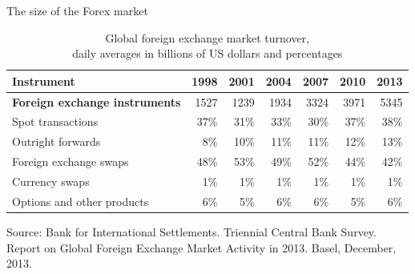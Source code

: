 \documentclass[international_finance_p1.tex]{subfiles}
\begin{document}
\begin{frame}[shrink=15]{The size of the Forex market}
\begin{table}[htbp]
  \centering
  \fontsize{10pt}{10pt}\selectfont
  \caption{Global foreign exchange market turnover,\\
daily averages in billions of US dollars and percentages}
\begin{tabularx}{\linewidth}[b]{@{}>{\raggedright\arraybackslash}Xrrrrrr@{}}
	\toprule
	Instrument                            & 1998 & 2001 & 2004 & 2007 & 2010 & 2013 \\ \midrule
	\textbf{Foreign exchange instruments} & 1527 & 1239 & 1934 & 3324 & 3971 & 5345 \\
	Spot transactions                     & 37\% & 31\% & 33\% & 30\% & 37\% & 38\% \\
	Outright forwards                     & 8\%  & 10\% & 11\% & 11\% & 12\% & 13\% \\
	Foreign exchange swaps                & 48\% & 53\% & 49\% & 52\% & 44\% & 42\% \\
	Currency swaps                        & 1\%  & 1\%  & 1\%  & 1\%  & 1\%  & 1\%  \\
	Options and other products            & 6\%  & 5\%  & 6\%  & 6\%  & 5\%  & 6\%  \\ \bottomrule
\end{tabularx}%
  \label{tab:addlabel}%
\end{table}%

Source: Bank for International Settlements. Triennial Central Bank Survey. Report on Global Foreign Exchange Market Activity in 2013. Basel, December, 2013.

\end{frame}
\end{document}
